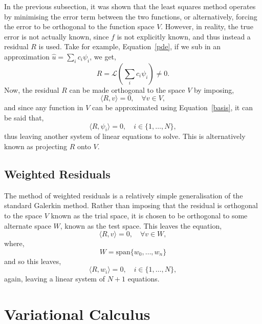 In the previous subsection, it was shown that the least squares method operates by minimising the error term between the two functions, or alternatively, forcing the error to be orthogonal to the function space $V$. However, in reality, the true error is not actually known, since $f$ is not explicitly known, and thus instead a residual $R$ is used. Take for example, Equation~\eqref{pde}, if we sub in an approximation $\hat{u} = \sum_i c_i \psi_i$, we get,
\begin{equation}
	R = \mathcal{L}\left(\sum_i c_i \psi_i\right) \neq 0.
\end{equation}
Now, the residual $R$ can be made orthogonal to the space $V$ by imposing,
\begin{equation}
	\langle R, v \rangle=0,\quad\forall v \in V,
\end{equation}
and since any function in $V$ can be approximated using Equation~\eqref{basis}, it can be said that,
\begin{equation}
	\langle R, \psi_i \rangle=0,\quad i\in\{1,\dots,N\},
\end{equation}
thus leaving another system of linear equations to solve. This is alternatively known as projecting $R$ onto $V$.

\subsection{Weighted Residuals}\label{residuals}

The method of weighted residuals is a relatively simple generalisation of the standard Galerkin method. Rather than imposing that the residual is orthogonal to the space $V$ known as the trial space, it is chosen to be orthogonal to some alternate space $W$, known as the test space. This leaves the equation,
\begin{equation}
	\langle R, v \rangle=0,\quad \forall v \in W,
\end{equation}
where,
\begin{equation}
	W = \text{span}\{w_0,\dots,w_n\}
\end{equation}
and so this leaves,
\begin{equation}
	\langle R, w_i \rangle=0,\quad i\in\{1,\dots,N\},
\end{equation}
again, leaving a linear system of $N+1$ equations.

\section{Variational Calculus}

